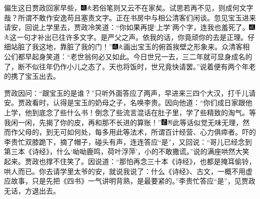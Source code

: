 偏生这日贾政回家早些，{\includegraphics[width=3mm]{../Images/00005}\includegraphics[width=3mm]{../Images/00012}\footnotesize \kaishu 若俗笔则又云不在家矣。试思若再不见，则成何文字哉？所谓不敢作安逸苟且塞责文字。}正在书房中与相公清客们闲谈。忽见宝玉进来请安，回说上学里去，贾政冷笑道：“你如果再提‘上学’两个字，连我也羞死了。{\includegraphics[width=3mm]{../Images/00005}\includegraphics[width=3mm]{../Images/00012}\footnotesize \kaishu 这一句才补出已往许多文字。是严父之声。}依我的话，你竟顽你的去是正理。仔细站脏了我这地，靠脏了我的门！”{\includegraphics[width=3mm]{../Images/00005}\includegraphics[width=3mm]{../Images/00012}\footnotesize \kaishu 画出宝玉的俯首挨壁之形象来。}众清客相公们都早起身笑道：“老世翁何必又如此。今日世兄一去，三二年就可显身成名的了，断不似往年仍作小儿之态了。天也将饭时，世兄竟快请罢。”说着便有两个年老的携了宝玉出去。

贾政因问：“跟宝玉的是谁？”只听外面答应了两声，早进来三四个大汉，打千儿请安。贾政看时，认得是宝玉的奶母之子，名唤李贵。因向他道：“你们成日家跟他上学，他到底念了些什么书！倒念了些流言混话在肚子里，学了些精致的淘气。等我闲一闲，先揭了你的皮，再和那不长进的算账！”{\includegraphics[width=3mm]{../Images/00006}\includegraphics[width=3mm]{../Images/00011}\footnotesize \kaishu 此等话似觉无味无理，然而作父母的，到无可如何处，每多用此等法术，所谓百计经营、心力俱瘁者。}吓的李贵忙双膝跪下，摘了帽子，碰头有声，连连答应“是”，又回说：“哥儿已经念到第三本《诗经》，什么‘呦呦鹿鸣，荷叶浮萍’，小的不敢撒谎。”说的满座哄然大笑起来。贾政也撑不住笑了。因说道：“那怕再念三十本《诗经》，也都是掩耳偷铃，哄人而已。你去请学里太爷的安，就说我说了：什么《诗经》、古文，一概不用虚应故事，只是先把《四书》一气讲明背熟，是最要紧的。”李贵忙答应“是”，见贾政无话，方退出去。

